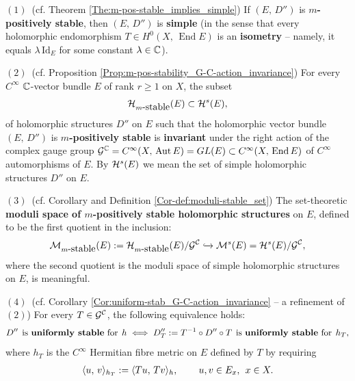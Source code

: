 \documentclass[12pt]{article}
\begin{document}
\begin{The}\label{The:introd_summary} $(1)$\, (cf. Theorem \ref{The:m-pos-stable_implies_simple}) If $(E,\,D'')$ is {\bf $m$-positively stable}, then $(E,\,D'')$ is {\bf simple} (in the sense that every holomorphic endomorphism $T\in H^0(X,\,\operatorname{End} E)$ is an {\bf isometry} -- namely, it equals $\lambda\,\mbox{Id}_E$ for some constant $\lambda\in\mathbb{C}$).

\vspace{1ex}

$(2)$\, (cf. Proposition \ref{Prop:m-pos-stability_G-C-action_invariance}) For every $C^\infty$ $\mathbb{C}$-vector bundle $E$ of rank $r\geq 1$ on $X$, the subset \begin{eqnarray*}{\cal H}_{m\mbox{-stable}}(E)\subset{\cal H}^s(E),\end{eqnarray*} of holomorphic structures $D''$ on $E$ such that the holomorphic vector bundle $(E,\,D'')$ is {\bf $m$-positively stable} is {\bf invariant} under the right action of the complex gauge group ${\cal G}^{\mathbb{C}} = C^\infty(X,\,\mbox{Aut}\,E) = GL(E)\subset C^\infty(X,\,\operatorname{End} E)$ of $C^\infty$ automorphisms of $E$. By ${\cal H}^s(E)$ we mean the set of simple holomorphic structures $D''$ on $E$.

\vspace{1ex}

$(3)$\, (cf. Corollary and Definition \ref{Cor-def:moduli-stable_set}) The set-theoretic {\bf moduli space of $m$-positively stable holomorphic structures} on $E$, defined to be the first quotient in the inclusion: \begin{eqnarray*}{\cal M}_{m\mbox{-stable}}(E):={\cal H}_{m\mbox{-stable}}(E)/{\cal G}^{\cal C}\xhookrightarrow { } {\cal M}^s(E)={\cal H}^s(E)/{\cal G}^{\cal C},\end{eqnarray*} where the second quotient is the moduli space of simple holomorphic structures on $E$, is meaningful.

\vspace{1ex}

$(4)$\, (cf. Corollary \ref{Cor:uniform-stab_G-C-action_invariance} -- a refinement of $(2)$) For every $T\in{\cal G}^{\cal C}$, the following equivalence holds: \begin{eqnarray*}D'' \hspace{1ex} \mbox{is {\bf uniformly stable} for}\hspace{1ex} h \iff  D''_T:=T^{-1}\circ D''\circ T \hspace{1ex} \mbox{is {\bf uniformly stable} for}\hspace{1ex} h_T,\end{eqnarray*} where $h_T$ is the $C^\infty$ Hermitian fibre metric on $E$ defined by $T$ by requiring \begin{eqnarray*}\langle u,\,v\rangle_{h_T}:= \langle Tu,\,Tv\rangle_h, \hspace{5ex} u,v\in E_x,\hspace{1ex} x\in X.\end{eqnarray*}


\end{The}
\end{document}
